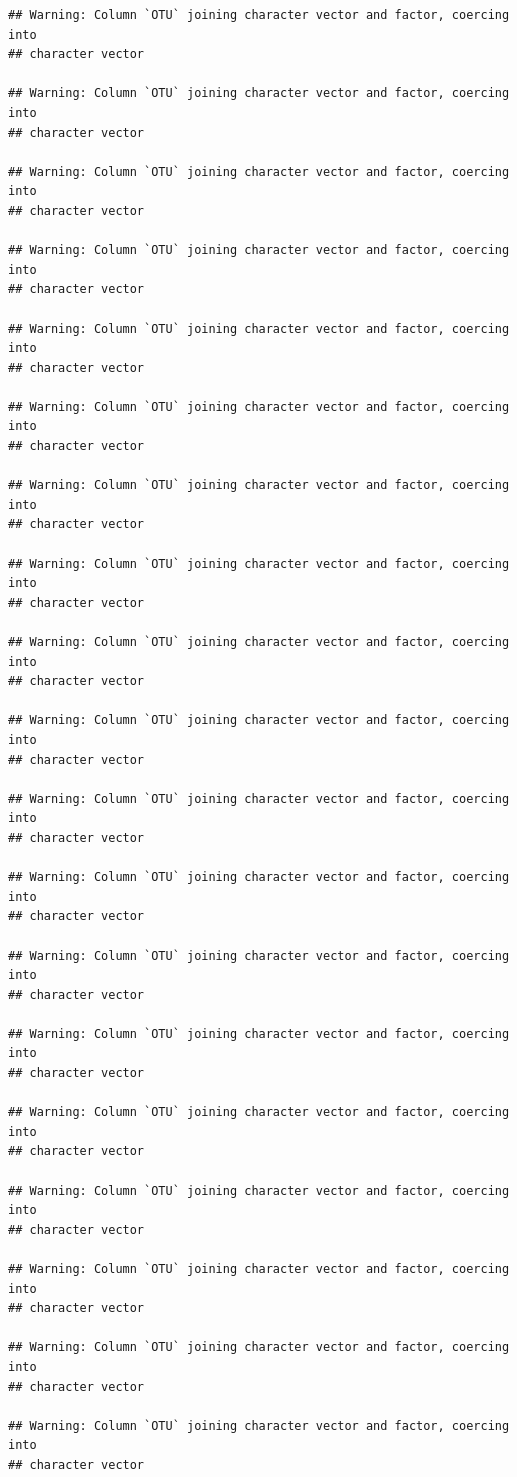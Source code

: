 \documentclass[]{article}
\begin{document}
\begin{verbatim}
## Warning: Column `OTU` joining character vector and factor, coercing into
## character vector

## Warning: Column `OTU` joining character vector and factor, coercing into
## character vector

## Warning: Column `OTU` joining character vector and factor, coercing into
## character vector

## Warning: Column `OTU` joining character vector and factor, coercing into
## character vector

## Warning: Column `OTU` joining character vector and factor, coercing into
## character vector

## Warning: Column `OTU` joining character vector and factor, coercing into
## character vector

## Warning: Column `OTU` joining character vector and factor, coercing into
## character vector

## Warning: Column `OTU` joining character vector and factor, coercing into
## character vector

## Warning: Column `OTU` joining character vector and factor, coercing into
## character vector

## Warning: Column `OTU` joining character vector and factor, coercing into
## character vector

## Warning: Column `OTU` joining character vector and factor, coercing into
## character vector

## Warning: Column `OTU` joining character vector and factor, coercing into
## character vector

## Warning: Column `OTU` joining character vector and factor, coercing into
## character vector

## Warning: Column `OTU` joining character vector and factor, coercing into
## character vector

## Warning: Column `OTU` joining character vector and factor, coercing into
## character vector

## Warning: Column `OTU` joining character vector and factor, coercing into
## character vector

## Warning: Column `OTU` joining character vector and factor, coercing into
## character vector

## Warning: Column `OTU` joining character vector and factor, coercing into
## character vector

## Warning: Column `OTU` joining character vector and factor, coercing into
## character vector


\end{verbatim}
\end{document}
